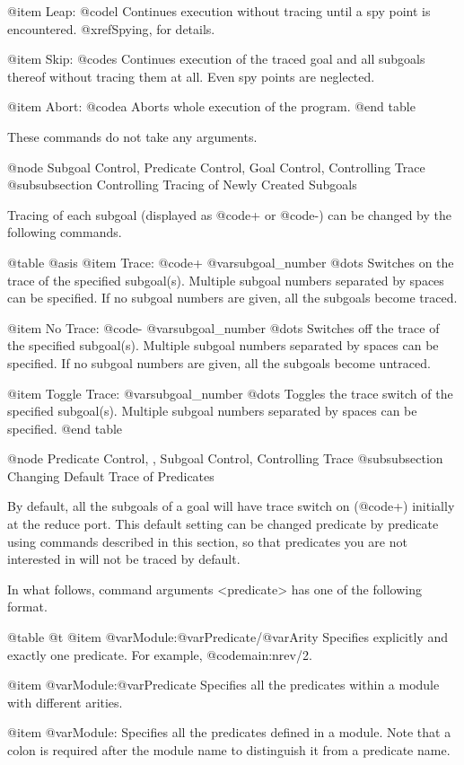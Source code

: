 {{{{@item Leap: @code{l}
Continues execution without tracing until a spy point is encountered.
@xref{Spying}, for details.

@item Skip: @code{s}
Continues execution of the traced goal and all subgoals thereof without
tracing them at all.  Even spy points are neglected.

@item Abort: @code{a}
Aborts whole execution of the program.
@end table

These commands do not take any arguments.

@node Subgoal Control, Predicate Control, Goal Control, Controlling Trace
@subsubsection Controlling Tracing of Newly Created Subgoals

Tracing of each subgoal (displayed as @code{+} or @code{-}) can be
changed by the following commands.

@table @asis
@item Trace: @code{+} @var{subgoal_number} @dots{}
Switches on the trace of the specified subgoal(s).  Multiple subgoal
numbers separated by spaces can be specified.  If no subgoal numbers are
given, all the subgoals become traced.

@item No Trace: @code{-} @var{subgoal_number} @dots{}
Switches off the trace of the specified subgoal(s).  Multiple subgoal
numbers separated by spaces can be specified.  If no subgoal numbers are
given, all the subgoals become untraced.

@item Toggle Trace: @var{subgoal_number} @dots{}
Toggles the trace switch of the specified subgoal(s).  Multiple subgoal
numbers separated by spaces can be specified.
@end table

@node Predicate Control,  , Subgoal Control, Controlling Trace
@subsubsection Changing Default Trace of Predicates

By default, all the subgoals of a goal will have trace switch on
(@code{+}) initially at the reduce port.  This default setting can be
changed predicate by predicate using commands described in this section,
so that predicates you are not interested in will not be traced by
default.

In what follows, command arguments <predicate> has one of the
following format.

@table @t
@item @var{Module}:@var{Predicate}/@var{Arity}
Specifies explicitly and exactly one predicate.  For example,
@code{main:nrev/2}.

@item @var{Module}:@var{Predicate}
Specifies all the predicates within a module with different arities.

@item @var{Module}:
Specifies all the predicates defined in a module.  Note that a colon is
required after the module name to distinguish it from a predicate
name.

}}}}
